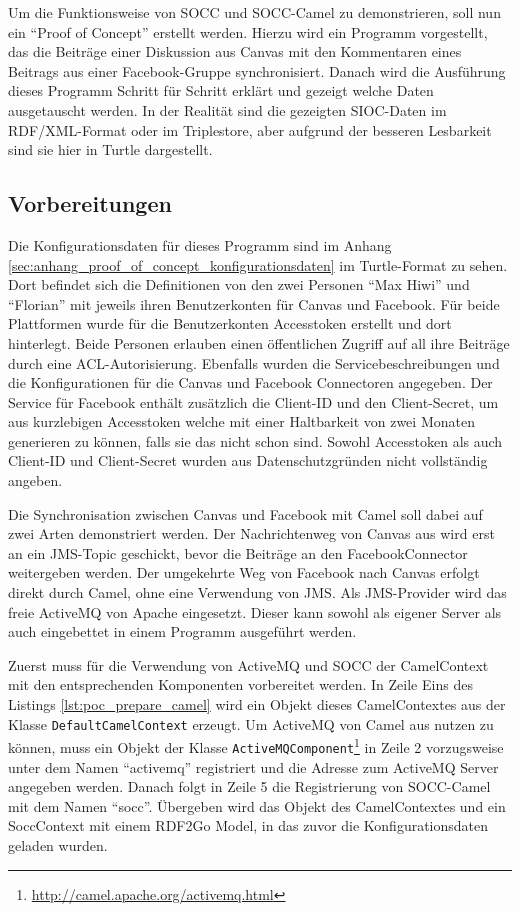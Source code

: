 Um die Funktionsweise von SOCC und SOCC-Camel zu demonstrieren, soll nun ein \enquote{Proof of Concept} erstellt werden. Hierzu wird ein Programm vorgestellt, das die Beiträge einer Diskussion aus Canvas mit den Kommentaren eines Beitrags aus einer Facebook-Gruppe synchronisiert. Danach wird die Ausführung dieses Programm Schritt für Schritt erklärt und gezeigt welche Daten ausgetauscht werden. In der Realität sind die gezeigten SIOC-Daten im RDF/XML-Format oder im Triplestore, aber aufgrund der besseren Lesbarkeit sind sie hier in Turtle dargestellt.

\subsection{Vorbereitungen} %
\label{sub:vorbereitungen}

Die Konfigurationsdaten für dieses Programm sind im Anhang \ref{sec:anhang_proof_of_concept_konfigurationsdaten} im Turtle-Format zu sehen. Dort befindet sich die Definitionen von den zwei Personen \enquote{Max Hiwi} und \enquote{Florian} mit jeweils ihren Benutzerkonten für Canvas und Facebook. Für beide Plattformen wurde für die Benutzerkonten Accesstoken erstellt und dort hinterlegt. Beide Personen erlauben einen öffentlichen Zugriff auf all ihre Beiträge durch eine ACL-Autorisierung. Ebenfalls wurden die Servicebeschreibungen und die Konfigurationen für die Canvas und Facebook Connectoren angegeben. Der Service für Facebook enthält zusätzlich die Client-ID und den Client-Secret, um aus kurzlebigen Accesstoken welche mit einer Haltbarkeit von zwei Monaten generieren zu können, falls sie das nicht schon sind. Sowohl Accesstoken als auch Client-ID und Client-Secret wurden aus Datenschutzgründen nicht vollständig angeben.

Die Synchronisation zwischen Canvas und Facebook mit Camel soll dabei auf zwei Arten demonstriert werden. Der Nachrichtenweg von Canvas aus wird erst an ein JMS-Topic geschickt, bevor die Beiträge an den FacebookConnector weitergeben werden. Der umgekehrte Weg von Facebook nach Canvas erfolgt direkt durch Camel, ohne eine Verwendung von JMS. Als JMS-Provider wird das freie ActiveMQ von Apache eingesetzt. Dieser kann sowohl als eigener Server als auch eingebettet in einem Programm ausgeführt werden.

Zuerst muss für die Verwendung von ActiveMQ und SOCC der CamelContext mit den entsprechenden Komponenten vorbereitet werden. In Zeile Eins des Listings \ref{lst:poc_prepare_camel} wird ein Objekt dieses CamelContextes aus der Klasse \texttt{DefaultCamelContext} erzeugt. Um ActiveMQ von Camel aus nutzen zu können, muss ein Objekt der Klasse \texttt{ActiveMQComponent}\footnote{\url{http://camel.apache.org/activemq.html}} in Zeile 2 vorzugsweise unter dem Namen \enquote{activemq} registriert und die Adresse zum ActiveMQ Server angegeben werden. Danach folgt in Zeile 5 die Registrierung von SOCC-Camel mit dem Namen \enquote{socc}. Übergeben wird das Objekt des CamelContextes und ein SoccContext mit einem RDF2Go Model, in das zuvor die Konfigurationsdaten geladen wurden.  

